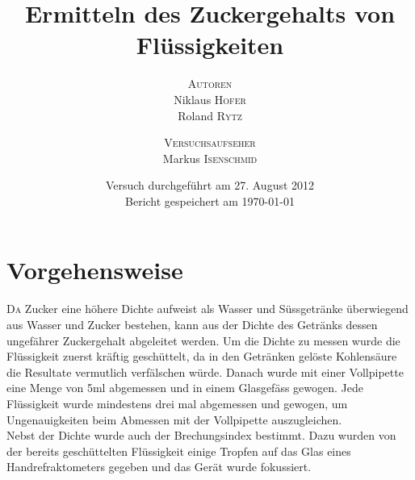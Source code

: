 \documentclass[a4paper]{article}
\title{
	\vspace{10mm}
	\fontsize{24pt}{10pt}
	\selectfont\textbf{
		Ermitteln des Zuckergehalts von Flüssigkeiten
	}\\[20mm]
}
\author{
	\Large{\textsc{Autoren}} \\[2mm] Niklaus \textsc{Hofer} \\[2mm] Roland \textsc{Rytz}
	\and
	\Large{\textsc{Versuchsaufseher}} \\[2mm]  Markus \textsc{Isenschmid} \\[120mm]
}
\date{Versuch durchgeführt am 27. August 2012 \\[2mm]
Bericht gespeichert am \today}
\begin{document}
\maketitle
\newpage

\thispagestyle{fancy} %


\begin{abstract}
\vspace{-2mm}

\end{abstract}



\section{Vorgehensweise}
\lettrine[findent=0.25em,nindent=-0em,slope=0mm,lines=2]{D}  a Zucker eine höhere Dichte aufweist als Wasser und Süssgetränke überwiegend aus Wasser und Zucker bestehen, kann aus der Dichte des Getränks dessen ungefährer Zuckergehalt abgeleitet werden. Um die Dichte zu messen wurde die Flüssigkeit zuerst kräftig geschüttelt, da in den Getränken gelöste Kohlensäure die Resultate vermutlich verfälschen würde. Danach wurde mit einer Vollpipette eine Menge von 5ml abgemessen und in einem Glasgefäss gewogen. Jede Flüssigkeit wurde mindestens drei mal abgemessen und gewogen, um Ungenauigkeiten beim Abmessen mit der Vollpipette auszugleichen.\\
Nebst der Dichte wurde auch der Brechungsindex bestimmt. Dazu wurden von der bereits geschüttelten Flüssigkeit einige Tropfen auf das Glas eines Handrefraktometers gegeben und das Gerät wurde fokussiert.
\end{document}

